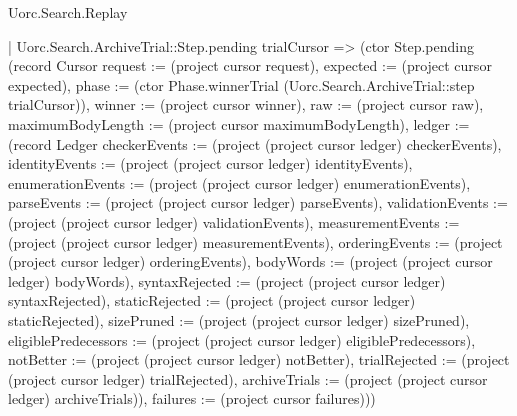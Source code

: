 \begin{lexlean}{Uorc.Search.Replay}
\begin{semanticmodule}
{      | Uorc.Search.ArchiveTrial::Step.pending trialCursor => (ctor Step.pending (record Cursor {request := (project cursor request), expected := (project cursor expected), phase := (ctor Phase.winnerTrial (Uorc.Search.ArchiveTrial::step trialCursor)), winner := (project cursor winner), raw := (project cursor raw), maximumBodyLength := (project cursor maximumBodyLength), ledger := (record Ledger {checkerEvents := (project (project cursor ledger) checkerEvents), identityEvents := (project (project cursor ledger) identityEvents), enumerationEvents := (project (project cursor ledger) enumerationEvents), parseEvents := (project (project cursor ledger) parseEvents), validationEvents := (project (project cursor ledger) validationEvents), measurementEvents := (project (project cursor ledger) measurementEvents), orderingEvents := (project (project cursor ledger) orderingEvents), bodyWords := (project (project cursor ledger) bodyWords), syntaxRejected := (project (project cursor ledger) syntaxRejected), staticRejected := (project (project cursor ledger) staticRejected), sizePruned := (project (project cursor ledger) sizePruned), eligiblePredecessors := (project (project cursor ledger) eligiblePredecessors), notBetter := (project (project cursor ledger) notBetter), trialRejected := (project (project cursor ledger) trialRejected), archiveTrials := (project (project cursor ledger) archiveTrials)}), failures := (project cursor failures)}))
}
\end{semanticmodule}
\end{lexlean}
